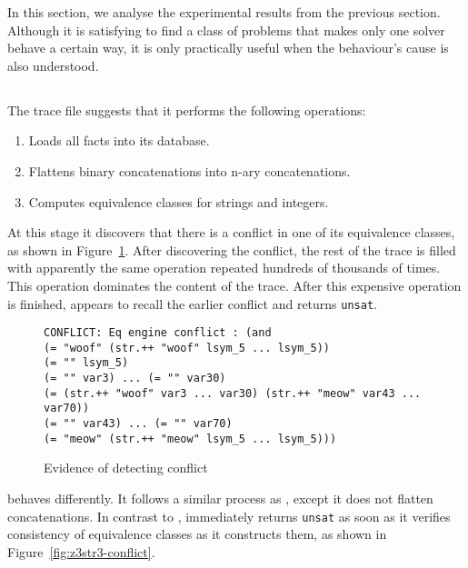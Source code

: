     In this section, we analyse the experimental results from the previous section. Although it is satisfying to find a class of problems that makes only one solver behave a certain way, it is only practically useful when the behaviour's cause is also understood.


    \subsection{\cHard{}}

        The \cvc{} trace file suggests that it performs the following operations:

        \begin{enumerate}
            \item Loads all facts into its database.
            \item Flattens binary concatenations into n-ary concatenations.
            \item Computes equivalence classes for strings and integers.
        \end{enumerate}

        At this stage it discovers that there is a conflict in one of its equivalence classes, as shown in Figure~\ref{fig:cvc4-conflict}. After discovering the conflict, the rest of the trace is filled with apparently the same operation repeated hundreds of thousands of times. This operation dominates the content of the trace. After this expensive operation is finished, \cvc{} appears to recall the earlier conflict and returns \texttt{unsat}.

        \begin{figure}[h]
            {\scriptsize\begin{verbatim}
CONFLICT: Eq engine conflict : (and
(= "woof" (str.++ "woof" lsym_5 ... lsym_5))
(= "" lsym_5)
(= "" var3) ... (= "" var30)
(= (str.++ "woof" var3 ... var30) (str.++ "meow" var43 ... var70))
(= "" var43) ... (= "" var70)
(= "meow" (str.++ "meow" lsym_5 ... lsym_5)))\end{verbatim}}
            \caption{Evidence of \cvc{} detecting conflict}
            \label{fig:cvc4-conflict}
        \end{figure}

        \us{} behaves differently. It follows a similar process as \cvc{}, except it does not flatten concatenations. In contrast to \cvc{}, \us{} immediately returns \texttt{unsat} as soon as it verifies consistency of equivalence classes as it constructs them, as shown in Figure~\ref{fig:z3str3-conflict}.

